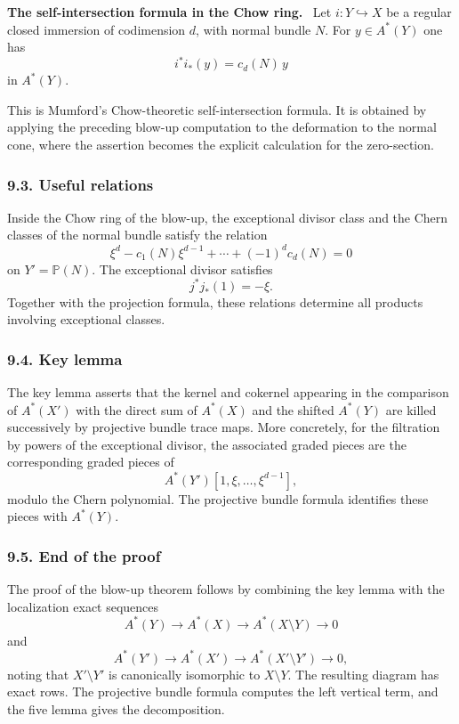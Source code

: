\documentclass[11pt]{article}
\theoremstyle{plain}
\theoremstyle{definition}
\theoremstyle{remark}
\newenvironment{statement}[1]{\par\medskip\noindent\textbf{#1.}\ }{\par\medskip}
\begin{document}
\begin{statement}{The self-intersection formula in the Chow ring}
Let $i:Y\hookrightarrow X$ be a regular closed immersion of codimension $d$, with normal bundle $N$. For $y\in A^*(Y)$ one has
\[
   i^*i_*(y)=c_d(N)\,y
\]
in $A^*(Y)$.
\end{statement}

This is Mumford's Chow-theoretic self-intersection formula. It is obtained by applying the preceding blow-up computation to the deformation to the normal cone, where the assertion becomes the explicit calculation for the zero-section.

\subsubsection*{9.3. Useful relations}

Inside the Chow ring of the blow-up, the exceptional divisor class and the Chern classes of the normal bundle satisfy the relation
\[
   \xi^d-c_1(N)\xi^{d-1}+\cdots+(-1)^d c_d(N)=0
\]
on $Y'=\mathbb P(N)$. The exceptional divisor satisfies
\[
   j^*j_*(1)=-\xi.
\]
Together with the projection formula, these relations determine all products involving exceptional classes.

\subsubsection*{9.4. Key lemma}

The key lemma asserts that the kernel and cokernel appearing in the comparison of $A^*(X')$ with the direct sum of $A^*(X)$ and the shifted $A^*(Y)$ are killed successively by projective bundle trace maps. More concretely, for the filtration by powers of the exceptional divisor, the associated graded pieces are the corresponding graded pieces of
\[
   A^*(Y')[1,\xi,\ldots,\xi^{d-1}],
\]
modulo the Chern polynomial. The projective bundle formula identifies these pieces with $A^*(Y)$.

\subsubsection*{9.5. End of the proof}

The proof of the blow-up theorem follows by combining the key lemma with the localization exact sequences
\[
   A^*(Y)\to A^*(X)\to A^*(X\setminus Y)\to0
\]
and
\[
   A^*(Y')\to A^*(X')\to A^*(X'\setminus Y')\to0,
\]
noting that $X'\setminus Y'$ is canonically isomorphic to $X\setminus Y$. The resulting diagram has exact rows. The projective bundle formula computes the left vertical term, and the five lemma gives the decomposition.
\end{document}
